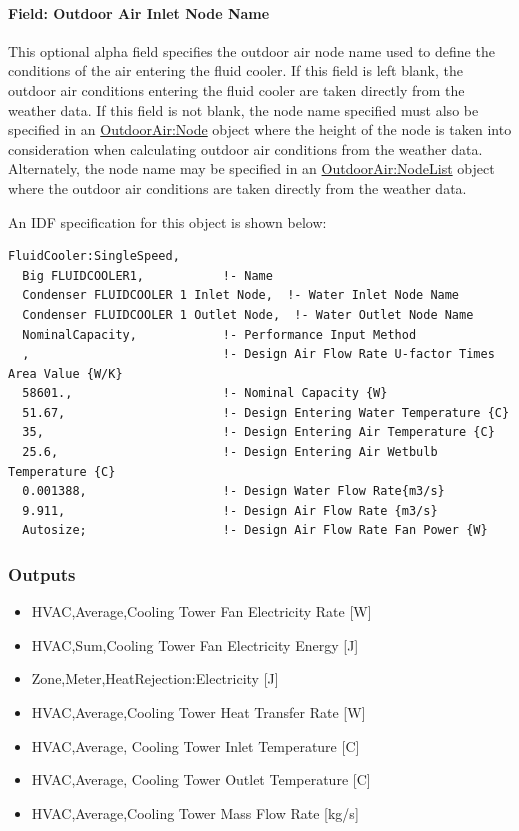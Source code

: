 \paragraph{Field: Outdoor Air Inlet Node Name}\label{field-outdoor-air-inlet-node-name-6}

This optional alpha field specifies the outdoor air node name used to define the conditions of the air entering the fluid cooler. If this field is left blank, the outdoor air conditions entering the fluid cooler are taken directly from the weather data. If this field is not blank, the node name specified must also be specified in an \hyperref[outdoorairnode]{OutdoorAir:Node} object where the height of the node is taken into consideration when calculating outdoor air conditions from the weather data. Alternately, the node name may be specified in an \hyperref[outdoorairnodelist]{OutdoorAir:NodeList} object where the outdoor air conditions are taken directly from the weather data.

An IDF specification for this object is shown below:

\begin{lstlisting}
FluidCooler:SingleSpeed,
  Big FLUIDCOOLER1,           !- Name
  Condenser FLUIDCOOLER 1 Inlet Node,  !- Water Inlet Node Name
  Condenser FLUIDCOOLER 1 Outlet Node,  !- Water Outlet Node Name
  NominalCapacity,            !- Performance Input Method
  ,                           !- Design Air Flow Rate U-factor Times Area Value {W/K}
  58601.,                     !- Nominal Capacity {W}
  51.67,                      !- Design Entering Water Temperature {C}
  35,                         !- Design Entering Air Temperature {C}
  25.6,                       !- Design Entering Air Wetbulb Temperature {C}
  0.001388,                   !- Design Water Flow Rate{m3/s}
  9.911,                      !- Design Air Flow Rate {m3/s}
  Autosize;                   !- Design Air Flow Rate Fan Power {W}
\end{lstlisting}

\subsubsection{Outputs}\label{outputs-8-000}

\begin{itemize}
\item
  HVAC,Average,Cooling Tower Fan Electricity Rate {[}W{]}
\item
  HVAC,Sum,Cooling Tower Fan Electricity Energy {[}J{]}
\item
  Zone,Meter,HeatRejection:Electricity {[}J{]}
\item
  HVAC,Average,Cooling Tower Heat Transfer Rate {[}W{]}
\item
  HVAC,Average, Cooling Tower Inlet Temperature {[}C{]}
\item
  HVAC,Average, Cooling Tower Outlet Temperature {[}C{]}
\item
  HVAC,Average,Cooling Tower Mass Flow Rate {[}kg/s{]}
\end{itemize}

